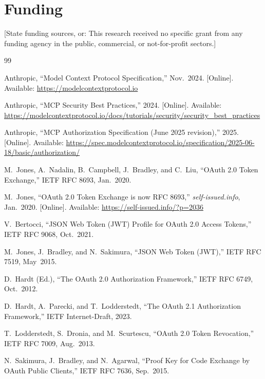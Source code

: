 \documentclass[journal]{IEEEtran}
\begin{document}
\section*{Funding}
[State funding sources, or: This research received no specific grant from any
funding agency in the public, commercial, or not-for-profit sectors.]

\balance

\begin{thebibliography}{99}

Anthropic, ``Model Context Protocol Specification,'' Nov.\ 2024.
[Online]. Available: \url{https://modelcontextprotocol.io}

Anthropic, ``MCP Security Best Practices,'' 2024.
[Online]. Available:
\url{https://modelcontextprotocol.io/docs/tutorials/security/security_best_practices}

Anthropic, ``MCP Authorization Specification (June 2025 revision),'' 2025.
[Online]. Available:
\url{https://spec.modelcontextprotocol.io/specification/2025-06-18/basic/authorization/}

M.\ Jones, A.\ Nadalin, B.\ Campbell, J.\ Bradley, and C.\ Liu,
``OAuth 2.0 Token Exchange,'' IETF RFC 8693, Jan.\ 2020.

M.\ Jones, ``OAuth 2.0 Token Exchange is now RFC 8693,''
\textit{self-issued.info}, Jan.\ 2020.
[Online]. Available: \url{https://self-issued.info/?p=2036}

V.\ Bertocci,
``JSON Web Token (JWT) Profile for OAuth 2.0 Access Tokens,''
IETF RFC 9068, Oct.\ 2021.

M.\ Jones, J.\ Bradley, and N.\ Sakimura,
``JSON Web Token (JWT),'' IETF RFC 7519, May\ 2015.

D.\ Hardt (Ed.),
``The OAuth 2.0 Authorization Framework,'' IETF RFC 6749, Oct.\ 2012.

D.\ Hardt, A.\ Parecki, and T.\ Lodderstedt,
``The OAuth 2.1 Authorization Framework,''
IETF Internet-Draft, 2023.

T.\ Lodderstedt, S.\ Dronia, and M.\ Scurtescu,
``OAuth 2.0 Token Revocation,'' IETF RFC 7009, Aug.\ 2013.

N.\ Sakimura, J.\ Bradley, and N.\ Agarwal,
``Proof Key for Code Exchange by OAuth Public Clients,''
IETF RFC 7636, Sep.\ 2015.


\end{thebibliography}
\end{document}
